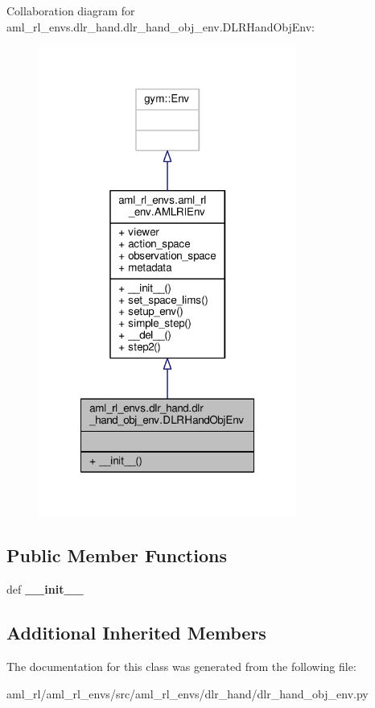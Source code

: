 Collaboration diagram for aml\-\_\-rl\-\_\-envs.\-dlr\-\_\-hand.\-dlr\-\_\-hand\-\_\-obj\-\_\-env.\-D\-L\-R\-Hand\-Obj\-Env\-:
\nopagebreak
\begin{figure}[H]
\begin{center}
\leavevmode
\includegraphics[width=240pt]{classaml__rl__envs_1_1dlr__hand_1_1dlr__hand__obj__env_1_1_d_l_r_hand_obj_env__coll__graph}
\end{center}
\end{figure}
\subsection*{Public Member Functions}
\begin{DoxyCompactItemize}
\item 
\hypertarget{classaml__rl__envs_1_1dlr__hand_1_1dlr__hand__obj__env_1_1_d_l_r_hand_obj_env_ae882b765624758f85ee59ba0ade74d9c}{def {\bfseries \-\_\-\-\_\-init\-\_\-\-\_\-}}\label{classaml__rl__envs_1_1dlr__hand_1_1dlr__hand__obj__env_1_1_d_l_r_hand_obj_env_ae882b765624758f85ee59ba0ade74d9c}

\end{DoxyCompactItemize}
\subsection*{Additional Inherited Members}


The documentation for this class was generated from the following file\-:\begin{DoxyCompactItemize}
\item 
aml\-\_\-rl/aml\-\_\-rl\-\_\-envs/src/aml\-\_\-rl\-\_\-envs/dlr\-\_\-hand/dlr\-\_\-hand\-\_\-obj\-\_\-env.\-py\end{DoxyCompactItemize}
